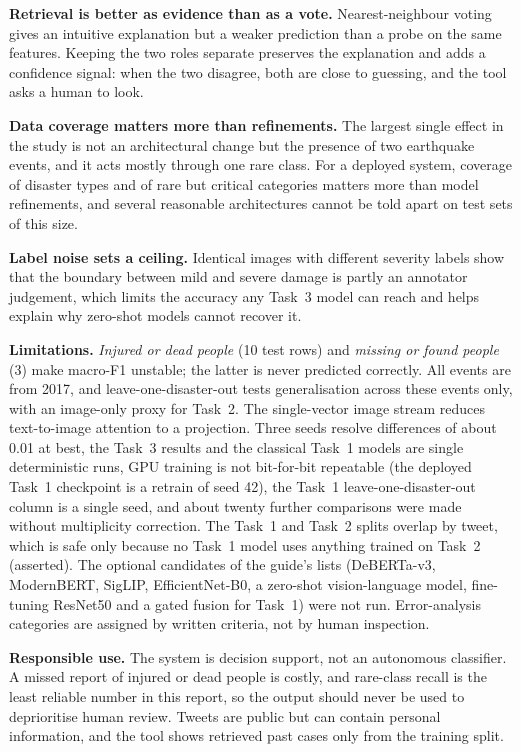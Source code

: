 \documentclass[conference]{IEEEtran}
\begin{document}
\textbf{Retrieval is better as evidence than as a vote.} Nearest-neighbour voting gives an intuitive explanation but a weaker prediction than a probe on the same features. Keeping the two roles separate preserves the explanation and adds a confidence signal: when the two disagree, both are close to guessing, and the tool asks a human to look.

\textbf{Data coverage matters more than refinements.} The largest single effect in the study is not an architectural change but the presence of two earthquake events, and it acts mostly through one rare class. For a deployed system, coverage of disaster types and of rare but critical categories matters more than model refinements, and several reasonable architectures cannot be told apart on test sets of this size.

\textbf{Label noise sets a ceiling.} Identical images with different severity labels show that the boundary between mild and severe damage is partly an annotator judgement, which limits the accuracy any Task~3 model can reach and helps explain why zero-shot models cannot recover it.

\textbf{Limitations.} \emph{Injured or dead people} (10 test rows) and \emph{missing or found people} (3) make macro-F1 unstable; the latter is never predicted correctly. All events are from 2017, and leave-one-disaster-out tests generalisation across these events only, with an image-only proxy for Task~2. The single-vector image stream reduces text-to-image attention to a projection. Three seeds resolve differences of about 0.01 at best, the Task~3 results and the classical Task~1 models are single deterministic runs, GPU training is not bit-for-bit repeatable (the deployed Task~1 checkpoint is a retrain of seed 42), the Task~1 leave-one-disaster-out column is a single seed, and about twenty further comparisons were made without multiplicity correction. The Task~1 and Task~2 splits overlap by tweet, which is safe only because no Task~1 model uses anything trained on Task~2 (asserted). The optional candidates of the guide's lists (DeBERTa-v3, ModernBERT, SigLIP, EfficientNet-B0, a zero-shot vision-language model, fine-tuning ResNet50 and a gated fusion for Task~1) were not run. Error-analysis categories are assigned by written criteria, not by human inspection.

\textbf{Responsible use.} The system is decision support, not an autonomous classifier. A missed report of injured or dead people is costly, and rare-class recall is the least reliable number in this report, so the output should never be used to deprioritise human review. Tweets are public but can contain personal information, and the tool shows retrieved past cases only from the training split.
\end{document}
